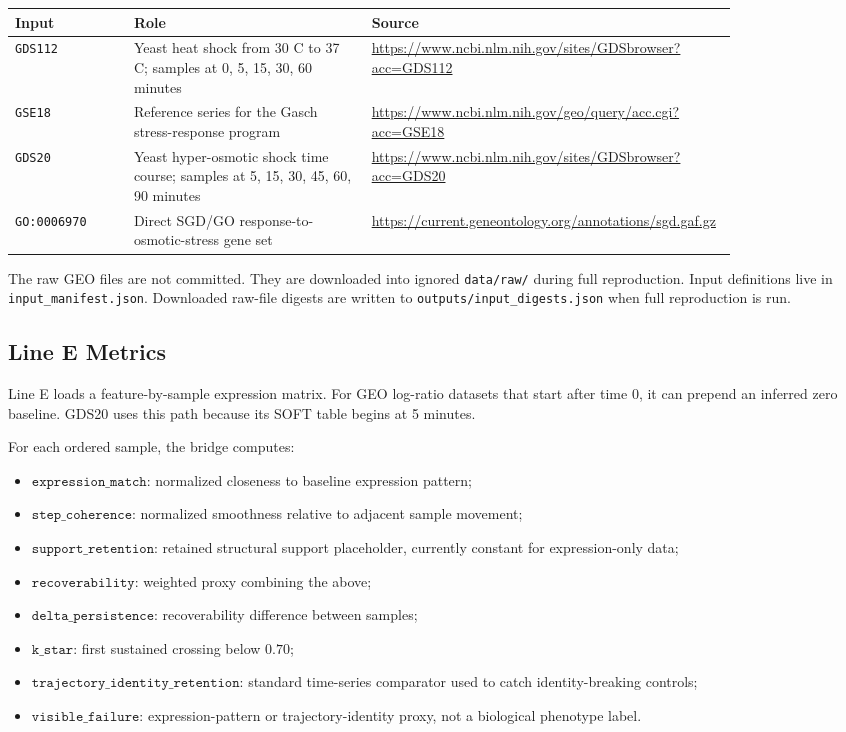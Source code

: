 \documentclass[11pt]{article}
\begin{document}
\begin{longtable}{p{0.16\linewidth}p{0.32\linewidth}p{0.36\linewidth}}
\toprule
Input & Role & Source \\
\midrule
\texttt{GDS112} & Yeast heat shock from 30 C to 37 C; samples at 0, 5, 15, 30, 60 minutes & \url{https://www.ncbi.nlm.nih.gov/sites/GDSbrowser?acc=GDS112} \\
\texttt{GSE18} & Reference series for the Gasch stress-response program & \url{https://www.ncbi.nlm.nih.gov/geo/query/acc.cgi?acc=GSE18} \\
\texttt{GDS20} & Yeast hyper-osmotic shock time course; samples at 5, 15, 30, 45, 60, 90 minutes & \url{https://www.ncbi.nlm.nih.gov/sites/GDSbrowser?acc=GDS20} \\
\texttt{GO:0006970} & Direct SGD/GO response-to-osmotic-stress gene set & \url{https://current.geneontology.org/annotations/sgd.gaf.gz} \\
\bottomrule
\end{longtable}

The raw GEO files are not committed. They are downloaded into ignored \texttt{data/raw/} during full reproduction. Input definitions live in \texttt{input\_manifest.json}. Downloaded raw-file digests are written to \texttt{outputs/input\_digests.json} when full reproduction is run.

\subsection{Line E Metrics}

Line E loads a feature-by-sample expression matrix. For GEO log-ratio datasets that start after time 0, it can prepend an inferred zero baseline. GDS20 uses this path because its SOFT table begins at 5 minutes.

For each ordered sample, the bridge computes:

\begin{itemize}
\item \(\texttt{expression\_match}\): normalized closeness to baseline expression pattern;
\item \(\texttt{step\_coherence}\): normalized smoothness relative to adjacent sample movement;
\item \(\texttt{support\_retention}\): retained structural support placeholder, currently constant for expression-only data;
\item \(\texttt{recoverability}\): weighted proxy combining the above;
\item \(\texttt{delta\_persistence}\): recoverability difference between samples;
\item \(\texttt{k\_star}\): first sustained crossing below \(0.70\);
\item \(\texttt{trajectory\_identity\_retention}\): standard time-series comparator used to catch identity-breaking controls;
\item \(\texttt{visible\_failure}\): expression-pattern or trajectory-identity proxy, not a biological phenotype label.
\end{itemize}
\end{document}
